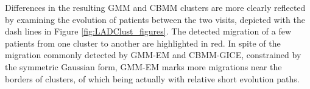 Differences in the resulting GMM and CBMM clusters are more clearly reflected by examining the evolution of patients between the two visits, depicted with the dash lines in Figure \ref{fig:LADClust_figures}. 
The detected migration of a few patients from one cluster to another are highlighted in red. In spite of the migration commonly detected by GMM-EM and CBMM-GICE, constrained by the symmetric Gaussian form, GMM-EM marks more migrations near the borders of clusters,  of which  being actually with relative short evolution paths.

